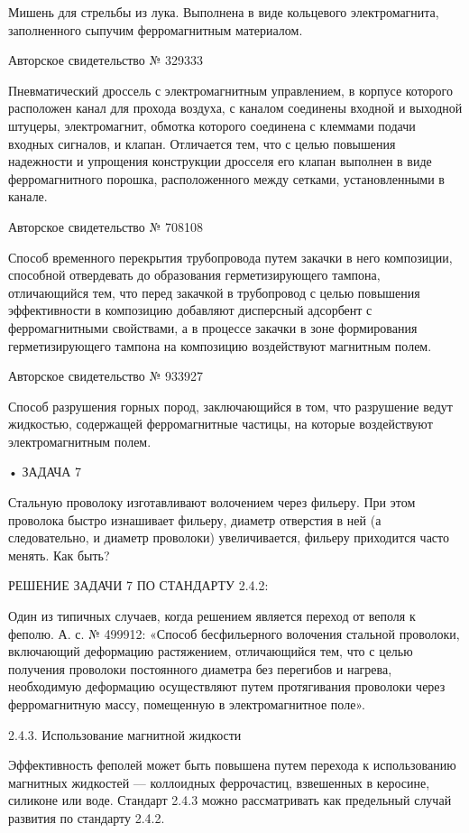 Мишень   для   стрельбы  из   лука.   Выполнена   в  виде   кольцевого
электромагнита, заполненного сыпучим ферромагнитным материалом.


Авторское свидетельство № 329333

Пневматический  дроссель  с  электромагнитным управлением,  в  корпусе
которого  расположен канал  для прохода  воздуха, с  каналом соединены
входной и выходной штуцеры,  электромагнит, обмотка которого соединена
с клеммами  подачи входных сигналов,  и клапан. Отличается тем,  что с
целью повышения надежности и упрощения конструкции дросселя его клапан
выполнен в виде ферромагнитного порошка, расположенного между сетками,
установленными в канале.


Авторское свидетельство № 708108

Способ  временного  перекрытия  трубопровода   путем  закачки  в  него
композиции,  способной  отвердевать  до  образования  герметизирующего
тампона, отличающийся  тем, что перед  закачкой в трубопровод  с целью
повышения эффективности в композицию  добавляют дисперсный адсорбент с
ферромагнитными свойствами,  а в процессе закачки  в зоне формирования
герметизирующего тампона на композицию воздействуют магнитным полем.


Авторское свидетельство № 933927

Способ разрушения  горных пород,  заключающийся в том,  что разрушение
ведут  жидкостью,   содержащей  ферромагнитные  частицы,   на  которые
воздействуют электромагнитным полем.


• ЗАДАЧА 7

Стальную проволоку  изготавливают волочением  через фильеру.  При этом
проволока  быстро  изнашивает  фильеру,  диаметр отверстия  в  ней  (а
следовательно, и диаметр  проволоки) увеличивается, фильеру приходится
часто менять. Как быть?


РЕШЕНИЕ ЗАДАЧИ 7 ПО СТАНДАРТУ 2.4.2:

Один из типичных случаев, когда  решением является переход от веполя к
феполю.  А.  с. №  499912:  «Способ  бесфильерного волочения  стальной
проволоки,  включающий деформацию  растяжением, отличающийся  тем, что
с  целью  получения  проволоки   постоянного  диаметра  без  перегибов
и  нагрева,  необходимую  деформацию осуществляют  путем  протягивания
проволоки  через ферромагнитную  массу, помещенную  в электромагнитное
поле».


2.4.3. Использование магнитной жидкости

Эффективность   феполей  может   быть   повышена   путем  перехода   к
использованию магнитных жидкостей — коллоидных феррочастиц, взвешенных
в керосине, силиконе или воде.  Стандарт 2.4.3 можно рассматривать как
предельный случай развития по стандарту 2.4.2.


